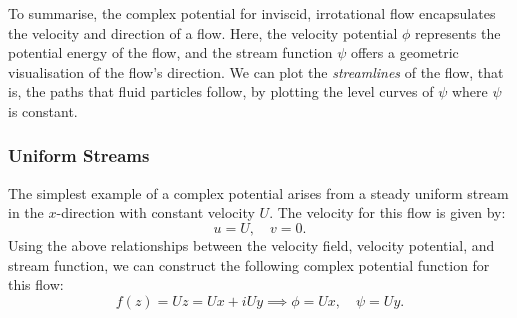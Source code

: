 \documentclass{article}
\theoremstyle{definition}
\begin{document}
To summarise, the complex potential for inviscid, irrotational flow
encapsulates the velocity and direction of a flow. Here, the velocity
potential \(\phi\) represents the potential energy of the flow, and the
stream function \(\psi\) offers a geometric visualisation of the flow's
direction. We can plot the \textit{streamlines} of the flow, that is,
the paths that fluid particles follow, by plotting the level curves of
\(\psi\) where \(\psi\) is constant.
\subsubsection{Uniform Streams}
The simplest example of a complex potential arises from a steady
uniform stream in the \(x\)-direction with constant velocity \(U\). The
velocity for this flow is given by:
\begin{equation*}
    u = U, \quad v = 0.
\end{equation*}
Using the above relationships between the velocity field, velocity
potential, and stream function, we can construct the following complex
potential function for this flow:
\begin{equation*}
    f\left( z \right) = Uz = Ux + i Uy \implies \phi = Ux, \quad \psi = Uy.
\end{equation*}
\end{document}

